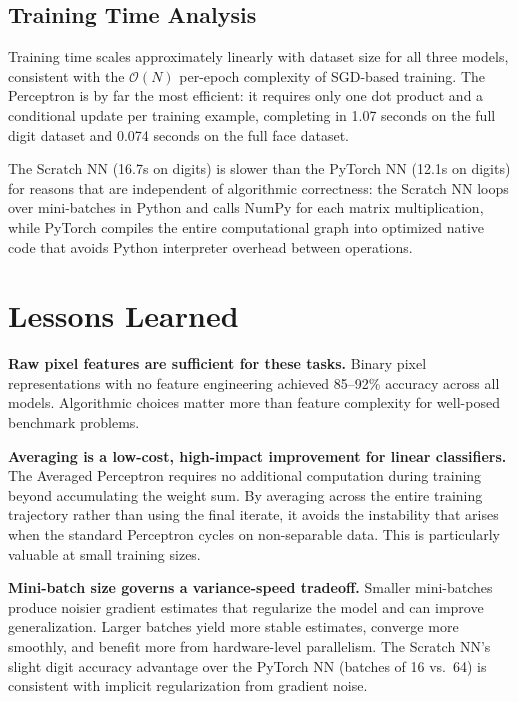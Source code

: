 \documentclass[12pt]{article}
\begin{document}
\subsection{Training Time Analysis}

Training time scales approximately linearly with dataset size for all three models,
consistent with the $\mathcal{O}(N)$ per-epoch complexity of SGD-based training. The
Perceptron is by far the most efficient: it requires only one dot product and a
conditional update per training example, completing in 1.07 seconds on the full digit
dataset and 0.074 seconds on the full face dataset.

The Scratch NN (16.7s on digits) is slower than the PyTorch NN (12.1s on digits) for
reasons that are independent of algorithmic correctness: the Scratch NN loops over
mini-batches in Python and calls NumPy for each matrix multiplication, while PyTorch
compiles the entire computational graph into optimized native code that avoids Python
interpreter overhead between operations.

\section{Lessons Learned}
\label{sec:lessons}

\textbf{Raw pixel features are sufficient for these tasks.} Binary pixel representations
with no feature engineering achieved 85--92\% accuracy across all models. Algorithmic
choices matter more than feature complexity for well-posed benchmark problems.

\textbf{Averaging is a low-cost, high-impact improvement for linear classifiers.} The
Averaged Perceptron requires no additional computation during training beyond accumulating
the weight sum. By averaging across the entire training trajectory rather than using the
final iterate, it avoids the instability that arises when the standard Perceptron cycles
on non-separable data. This is particularly valuable at small training sizes.

\textbf{Mini-batch size governs a variance-speed tradeoff.} Smaller mini-batches produce
noisier gradient estimates that regularize the model and can improve generalization.
Larger batches yield more stable estimates, converge more smoothly, and benefit more from
hardware-level parallelism. The Scratch NN's slight digit accuracy advantage over the
PyTorch NN (batches of 16 vs.\ 64) is consistent with implicit regularization from
gradient noise.
\end{document}
